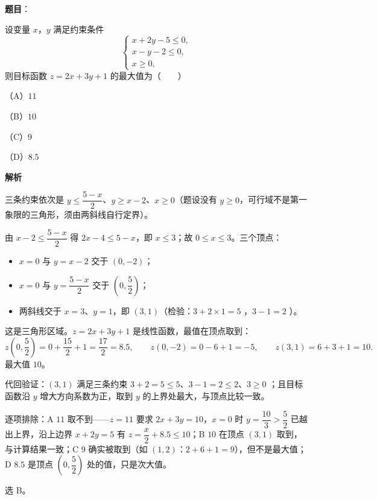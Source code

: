 \begin{answer}

\textbf{题目}：

设变量 $x$，$y$ 满足约束条件
\nopagebreak[4]
\[
\begin{cases}
x+2y-5\leqslant 0,\\
x-y-2\leqslant 0,\\
x\geqslant 0,
\end{cases}
\]
则目标函数 $z=2x+3y+1$ 的最大值为\mbox{（　　）}

（A）$11$

（B）$10$

（C）$9$

（D）$8.5$

\textbf{解析}

三条约束依次是 $y\leqslant\dfrac{5-x}{2}$、$y\geqslant x-2$、$x\geqslant0$（题设没有 $y\geqslant0$，可行域不是第一象限的三角形，须由两斜线自行定界）。

由 $x-2\leqslant\dfrac{5-x}{2}$ 得 $2x-4\leqslant5-x$，即 $x\leqslant3$；故 $0\leqslant x\leqslant3$。三个顶点：

\begin{itemize}
\item $x=0$ 与 $y=x-2$ 交于 $(0,-2)$；
\item $x=0$ 与 $y=\dfrac{5-x}{2}$ 交于 $\left(0,\dfrac52\right)$；
\item 两斜线交于 $x=3$、$y=1$，即 $(3,1)$（检验：$3+2\times1=5$ ，$3-1=2$ ）。
\end{itemize}

这是三角形区域。$z=2x+3y+1$ 是线性函数，最值在顶点取到：
\nopagebreak[4]
\[
z\left(0,\frac52\right)=0+\frac{15}{2}+1=\frac{17}{2}=8.5,\qquad
z(0,-2)=0-6+1=-5,\qquad
z(3,1)=6+3+1=10.
\]
最大值 $10$。

代回验证：$(3,1)$ 满足三条约束 $3+2=5\leqslant5$、$3-1=2\leqslant2$、$3\geqslant0$ ；且目标函数沿 $y$ 增大方向系数为正，取到 $y$ 的上界处最大，与顶点比较一致。

逐项排除：A $11$ 取不到——$z=11$ 要求 $2x+3y=10$，$x=0$ 时 $y=\dfrac{10}{3}>\dfrac52$ 已越出上界，沿上边界 $x+2y=5$ 有 $z=\dfrac x2+8.5\leqslant10$；B $10$ 在顶点 $(3,1)$ 取到，与计算结果一致；C $9$ 确实被取到（如 $(1,2)$：$2+6+1=9$），但不是最大值；D $8.5$ 是顶点 $\left(0,\dfrac52\right)$ 处的值，只是次大值。

选 B。


\end{answer}
